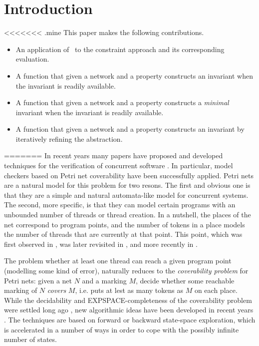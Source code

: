 \section{Introduction}

<<<<<<< .mine
This paper makes the following contributions.
\begin{itemize}
\item An application of \zthree\ to the constraint approach and its
  corresponding evaluation.
\item A function that given a network and a property constructs an
  invariant when the invariant is readily available.
\item A function that given a network and a property constructs a
  \emph{minimal} invariant when the invariant is readily available.
\item A function that given a network and a property constructs an
  invariant by iteratively refining the abstraction.
\end{itemize}=======
In recent years many papers have proposed and developed techniques
for the verification of concurrent software \cite{}. In particular, model 
checkers based on Petri net coverability have been successfully applied.
Petri nets are a natural model for this problem for two resons.
The first and obvious one is that they are a simple and natural
automata-like model for concurrent systems. The second, more specific, is that
they can model certain programs with an unbounded number of threads or
thread creation. In a nutshell, the places of the net correspond to
program points, and the number of tokens in a place models the number of
threads that are currently at that point. This point, which was first observed in 
\cite{}, was later revisited in \cite{}, and more recently in \cite{}.

The problem whether at least one
thread can reach a given program point (modelling some kind of error),
naturally reduces to the {\em coverability problem} for Petri nets:
given a net $N$ and a marking $M$, decide whether some reachable marking
of $N$ {\em covers} $M$, i.e. puts at lest as many tokens as $M$ on each
place. While the decidability and EXPSPACE-completeness of the
coverability problem were settled long ago \cite{}, new algorithmic 
ideas have been developed in recent years \cite{}. The techniques are 
based on forward or backward state-space exploration, which is accelerated 
in a number of ways in order to cope with the possibly infinite number of states. 

